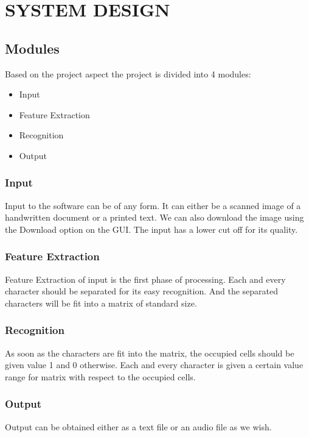 \documentclass[12pt,a4paper,oneside]{report}
\begin{document}
\chapter{SYSTEM DESIGN}
\section{Modules}
Based on the project aspect the project is divided into 4 modules:
\begin{itemize}
\item Input
\item Feature Extraction
\item Recognition
\item Output
\end{itemize}
\subsection{Input}
Input to the software can be of any form. It can either be a scanned image of a handwritten document or a printed text. We can also download the image using the Download option on the GUI. The input has a lower cut off for its quality.

\subsection{Feature Extraction}
Feature Extraction of input is the first phase of processing. Each and every character should be separated for its easy recognition. And the separated characters will be fit into a matrix of standard size.

\subsection{Recognition} 
As soon as the characters are fit into the matrix, the occupied cells should be given value 1 and 0 otherwise. Each and every character is given a certain value range for matrix with respect to the occupied cells.

\subsection{Output}
Output can be obtained either as a text file or an audio file as we wish. 
\end{document}
